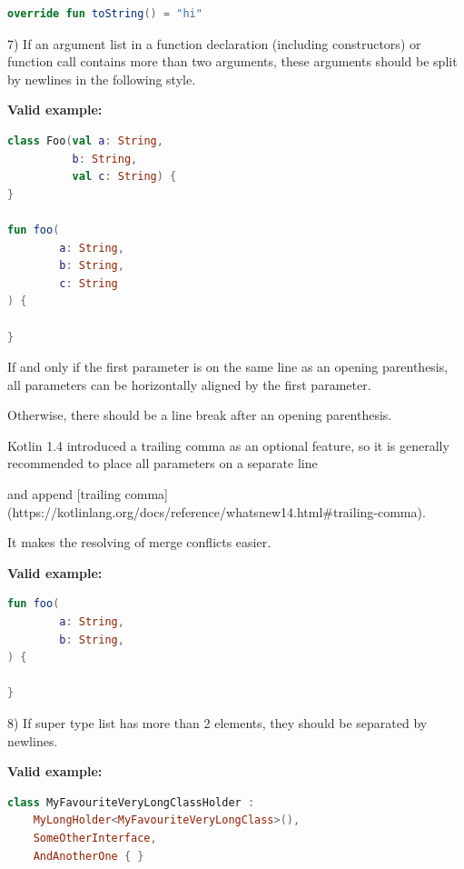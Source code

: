 {{\begin{lstlisting}[language=Kotlin]
override fun toString() = "hi"
\end{lstlisting}


7)  If an argument list in a function declaration (including constructors) or function call contains more than two arguments, these arguments should be split by newlines in the following style.



\textbf{Valid example:} 

\begin{lstlisting}[language=Kotlin]
class Foo(val a: String,
          b: String,
          val c: String) {
}

fun foo(
        a: String,
        b: String,
        c: String
) {

}
\end{lstlisting}


If and only if the first parameter is on the same line as an opening parenthesis, all parameters can be horizontally aligned by the first parameter.

Otherwise, there should be a line break after an opening parenthesis.



Kotlin 1.4 introduced a trailing comma as an optional feature, so it is generally recommended to place all parameters on a separate line

and append [trailing comma](https://kotlinlang.org/docs/reference/whatsnew14.html\#trailing-comma).

It makes the resolving of merge conflicts easier.



\textbf{Valid example:} 

\begin{lstlisting}[language=Kotlin]
fun foo(
        a: String,
        b: String,
) {

}
\end{lstlisting}


8) If super type list has more than 2 elements, they should be separated by newlines.



\textbf{Valid example:} 

\begin{lstlisting}[language=Kotlin]
class MyFavouriteVeryLongClassHolder :
    MyLongHolder<MyFavouriteVeryLongClass>(),
    SomeOtherInterface,
    AndAnotherOne { }
\end{lstlisting}


}}
